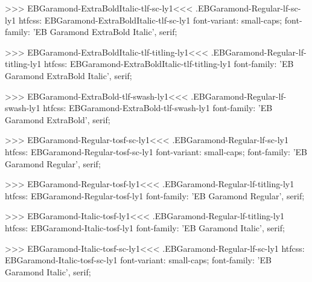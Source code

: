 {{>>>
\<EBGaramond-ExtraBoldItalic-tlf-sc-ly1\><<<
.EBGaramond-Regular-lf-sc-ly1
htfcss:  EBGaramond-ExtraBoldItalic-tlf-sc-ly1  font-variant: small-caps; font-family: 'EB Garamond ExtraBold Italic', serif;

>>>
\<EBGaramond-ExtraBoldItalic-tlf-titling-ly1\><<<
.EBGaramond-Regular-lf-titling-ly1
htfcss:  EBGaramond-ExtraBoldItalic-tlf-titling-ly1  font-family: 'EB Garamond ExtraBold Italic', serif;

>>>
\<EBGaramond-ExtraBold-tlf-swash-ly1\><<<
.EBGaramond-Regular-lf-swash-ly1
htfcss:  EBGaramond-ExtraBold-tlf-swash-ly1  font-family: 'EB Garamond ExtraBold', serif;

>>>
\<EBGaramond-Regular-tosf-sc-ly1\><<<
.EBGaramond-Regular-lf-sc-ly1
htfcss:  EBGaramond-Regular-tosf-sc-ly1  font-variant: small-caps; font-family: 'EB Garamond Regular', serif;

>>>
\<EBGaramond-Regular-tosf-ly1\><<<
.EBGaramond-Regular-lf-titling-ly1
htfcss:  EBGaramond-Regular-tosf-ly1  font-family: 'EB Garamond Regular', serif;

>>>
\<EBGaramond-Italic-tosf-ly1\><<<
.EBGaramond-Regular-lf-titling-ly1
htfcss:  EBGaramond-Italic-tosf-ly1  font-family: 'EB Garamond Italic', serif;

>>>
\<EBGaramond-Italic-tosf-sc-ly1\><<<
.EBGaramond-Regular-lf-sc-ly1
htfcss:  EBGaramond-Italic-tosf-sc-ly1  font-variant: small-caps; font-family: 'EB Garamond Italic', serif;

}}
